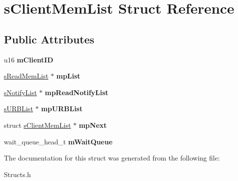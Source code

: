 \hypertarget{structsClientMemList}{\section{s\-Client\-Mem\-List \-Struct \-Reference}
\label{structsClientMemList}
}
\subsection*{\-Public \-Attributes}
\begin{DoxyCompactItemize}
\item 
\hypertarget{structsClientMemList_a4296a67b097fe0ef8d1778233469ac7f}{u16 {\bfseries m\-Client\-I\-D}}\label{structsClientMemList_a4296a67b097fe0ef8d1778233469ac7f}

\item 
\hypertarget{structsClientMemList_ad2885556a4b94ea4aeb237e54303540b}{\hyperlink{structsReadMemList}{s\-Read\-Mem\-List} $\ast$ {\bfseries mp\-List}}\label{structsClientMemList_ad2885556a4b94ea4aeb237e54303540b}

\item 
\hypertarget{structsClientMemList_a4f31e4f0c91963b4a75fb15246a5c851}{\hyperlink{structsNotifyList}{s\-Notify\-List} $\ast$ {\bfseries mp\-Read\-Notify\-List}}\label{structsClientMemList_a4f31e4f0c91963b4a75fb15246a5c851}

\item 
\hypertarget{structsClientMemList_ab38f3886e63189d2e4bb0b3a5bbce32d}{\hyperlink{structsURBList}{s\-U\-R\-B\-List} $\ast$ {\bfseries mp\-U\-R\-B\-List}}\label{structsClientMemList_ab38f3886e63189d2e4bb0b3a5bbce32d}

\item 
\hypertarget{structsClientMemList_a007c82dddabe16ff61333d7cd61b0fd2}{struct \hyperlink{structsClientMemList}{s\-Client\-Mem\-List} $\ast$ {\bfseries mp\-Next}}\label{structsClientMemList_a007c82dddabe16ff61333d7cd61b0fd2}

\item 
\hypertarget{structsClientMemList_ab4e0dfb44f1959d31b9c0fafd53af3d6}{wait\-\_\-queue\-\_\-head\-\_\-t {\bfseries m\-Wait\-Queue}}\label{structsClientMemList_ab4e0dfb44f1959d31b9c0fafd53af3d6}

\end{DoxyCompactItemize}


\-The documentation for this struct was generated from the following file\-:\begin{DoxyCompactItemize}
\item 
\-Structs.\-h\end{DoxyCompactItemize}
